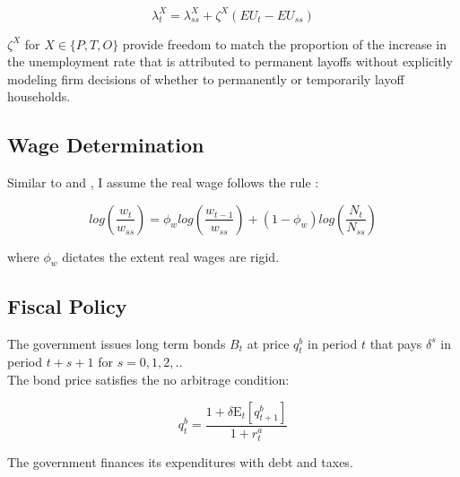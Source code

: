 $$\lambda^{X}_{t} =  \lambda^{X}_{ss} + \zeta^{X}(EU_{t} - EU_{ss})$$







\vspace{.5cm}

$\zeta^{X}$ for $X \in \{P, T, O\}$ provide freedom to match the proportion of the increase in the unemployment rate that is attributed to permanent layoffs without explicitly modeling firm decisions of whether to permanently or temporarily layoff households. 

\vspace{.5cm}


\hypertarget{Wage Determination}{}
\subsection{Wage Determination }


Similar to \cite{Gornemann2021} and \cite{Blanchard2010} , I assume the real wage follows the rule :

$$log\left(\frac{w_{t}}{w_{ss}}\right)  = \phi_w log\left( \frac{ w_{t-1}}{ w_{ss}} \right) +   (1 - \phi_w) log\left( \frac{N_{t}}{N_{ss}}\right)$$
\vspace{.2cm}

where $\phi_w$ dictates the extent real wages are rigid. 



\hypertarget{Fiscal Policy}{}
\subsection{Fiscal Policy}

The government issues long term bonds $B_{t}$ at price $q^{b}_{t}$ in period $t$ that pays $\delta^{s}$ in period $t+s+1$ for $s = 0,1,2, ..$ \\

The bond price satisfies the no arbitrage condition:

$$q^{b}_{t} = \frac{ 1  + \delta \mathrm{E}_{t}[q^{b}_{t+1}]}{1+r^{a}_{t}}$$ 

The government finances its expenditures with debt and taxes. 

